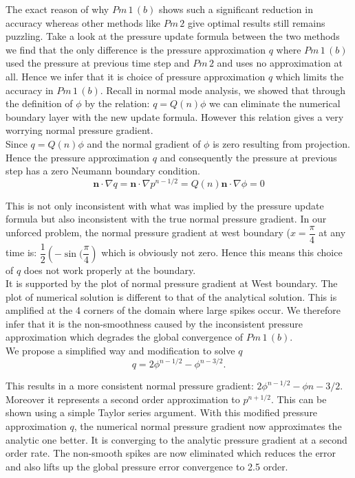 The exact reason of why $Pm\,1\,(b)$ shows such a significant reduction in accuracy whereas other methods like $Pm\,2$ give optimal results still remains puzzling. Take a look at the pressure update formula between the two methods we find that the only difference is the pressure approximation $q$ where $Pm\,1\,(b)$ used the pressure at previous time step and $Pm\,2$ and uses no approximation at all. Hence we infer that it is choice of pressure approximation $q$ which limits the accuracy in $Pm\,1\,(b)$. Recall in normal mode analysis, we showed that through the definition of $\phi$ by the relation: $q = Q(n)\phi$ we can eliminate the numerical boundary layer with the new update formula. However this relation gives a very worrying normal pressure gradient.\\

Since $q = Q(n)\phi$ and the normal gradient of $\phi$ is zero resulting from projection. Hence the pressure approximation $q$ and consequently the pressure at previous step has a zero Neumann boundary condition. 
\begin{equation}
\textbf{n} \cdot \nabla q = \textbf{n} \cdot \nabla p^{n-1/2} = Q(n) \textbf{n}\cdot \nabla \phi = 0
\end{equation}

This is not only inconsistent with what was implied by the pressure update formula but also inconsistent with the true normal pressure gradient. In our unforced problem, the normal pressure gradient at west boundary ($x=\dfrac{\pi}{4}$ at any time is: $\dfrac{1}{2}\left(-\sin(\dfrac{\pi}{4}\right)$ which is obviously not zero. Hence this means this choice of $q$ does not work properly at the boundary.\\

It is supported by the plot of normal pressure gradient at West boundary. The plot of numerical solution is  different to that of the analytical solution. This is amplified at the 4 corners of the domain where large spikes occur. We therefore infer that it is the non-smoothness caused by the inconsistent pressure approximation which degrades the global convergence of $Pm\,1\,(b)$.\\

We propose a simplified way and modification to solve $q$ 
\begin{equation}
q = 2\phi^{n-1/2} - \phi^{n-3/2}.
\end{equation}

This results in a more consistent normal pressure gradient: $2\phi^{n-1/2} - \phi{n-3/2}$. Moreover it represents a second order approximation to $p^{n+1/2}$. This can be shown using a simple Taylor series argument. With this modified pressure approximation $q$, the numerical normal pressure gradient now approximates the analytic one better. It is converging to the analytic pressure gradient at a second order rate. The non-smooth spikes are now eliminated which reduces the error and also lifts up the global pressure error convergence to 2.5 order.\\

